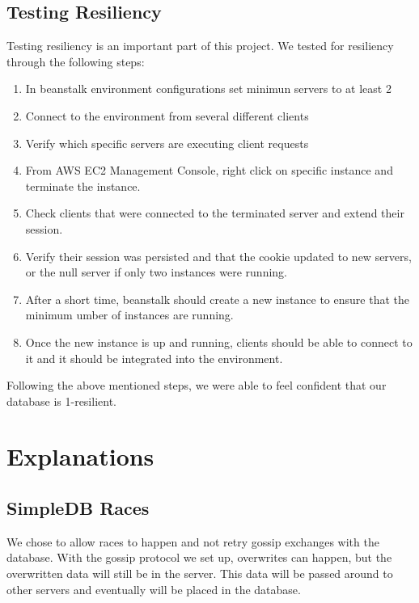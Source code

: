 \documentclass[11pt,letterpaper]{article}
\begin{document}
\subsection{Testing Resiliency}
Testing resiliency is an important part of this project. We tested for resiliency through the following steps:
\begin{enumerate}
\item In beanstalk environment configurations set minimun servers to at least 2
\item Connect to the environment from several different clients
\item Verify which specific servers are executing client requests
\item From AWS EC2 Management Console, right click on specific instance and terminate the instance.
\item Check clients that were connected to the terminated server and extend their session.
\item Verify their session was persisted and that the cookie updated to new servers, or the null server if only two instances were running.
\item After a short time, beanstalk should create a new instance to ensure that the minimum umber of instances are running.
\item Once the new instance is up and running, clients should be able to connect to it and it should be integrated into the environment.
\end{enumerate}
Following the above mentioned steps, we were able to feel confident that our database is 1-resilient.
\section{Explanations}

\subsection{SimpleDB Races}
We chose to allow races to happen and not retry gossip exchanges with the database. With the gossip protocol we set up, overwrites can happen, but the overwritten data will still be in the server. This data will be passed around to other servers and eventually will be placed in the database.
\end{document}

